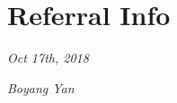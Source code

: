 \documentclass[]{friggeri-cv}
\begin{document}
\section{Referral Info}
\begin{flushleft}
\emph{Oct 17th, 2018}
\end{flushleft}
\begin{flushright}
\emph{Boyang Yan}
\end{flushright}

% 
\end{document}
